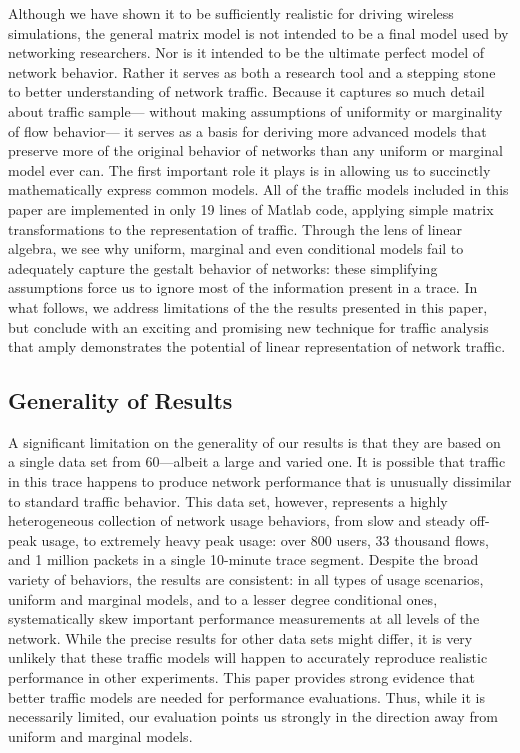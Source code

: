\documentclass[twocolumn,final]{svjour3}
\begin{document}
Although we have shown it to be sufficiently realistic for driving wireless simulations, the general matrix model is not intended to be a final model used by networking researchers.
Nor is it intended to be the ultimate perfect model of network behavior.
Rather it serves as both a research tool and a stepping stone to better understanding of network traffic.
Because it captures so much detail about traffic sample---%
without making assumptions of uniformity or marginality of flow behavior---%
it serves as a basis for deriving more advanced models that preserve more of the original behavior of networks than any uniform or marginal model ever can.
The first important role it plays is in allowing us to succinctly mathematically express common models.
All of the traffic models included in this paper are implemented in only 19 lines of Matlab code, applying simple matrix transformations to the  representation of traffic.
Through the lens of linear algebra, we see why uniform, marginal and even conditional models fail to adequately capture the gestalt behavior of networks:
these simplifying assumptions force us to ignore most of the information present in a trace.
In what follows, we address limitations of the the results presented in this paper, but conclude with an exciting and promising new technique for traffic analysis that amply demonstrates the potential of linear representation of network traffic.

\subsection{Generality of Results}


A significant limitation on the generality of our results is that they are based on a single data set from 60---albeit a large and varied one. It is possible that traffic in this trace happens to produce network performance that is unusually dissimilar to standard traffic behavior.
This data set, however, represents a highly heterogeneous collection of network usage behaviors, from slow and steady off-peak usage, to extremely heavy peak usage:
over 800 users, 33 thousand flows, and 1 million packets in a single 10-minute trace segment.
Despite the broad variety of behaviors, the results are consistent:
in all types of usage scenarios, uniform and marginal models, and to a lesser degree conditional ones, systematically skew important performance measurements at all levels of the network.
While the precise results for other data sets might differ, it is very unlikely that these traffic models will happen to accurately reproduce realistic performance in other experiments.
This paper provides strong evidence that better traffic models are needed for performance evaluations.
Thus, while it is necessarily limited, our evaluation points us strongly in the direction away from uniform and marginal models.
\end{document}
